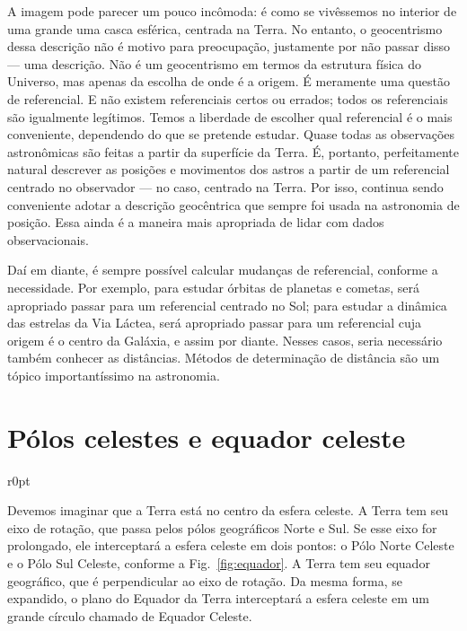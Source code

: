 A imagem pode parecer um pouco incômoda: é como se vivêssemos no interior de uma grande uma casca esférica, centrada na Terra. No entanto, o geocentrismo dessa descrição não é motivo para preocupação, justamente por não passar disso --- uma descrição. Não é um geocentrismo em termos da estrutura física do Universo, mas apenas da escolha de onde é a origem. É meramente uma questão de referencial. E não existem referenciais certos ou errados; todos os referenciais são igualmente legítimos. Temos a liberdade de escolher qual referencial é o mais conveniente, dependendo do que se pretende estudar. Quase todas as observações astronômicas são feitas a partir da superfície da Terra. É, portanto, perfeitamente natural descrever as posições e movimentos dos astros a partir de um referencial centrado no observador --- no caso, centrado na Terra. Por isso, continua sendo conveniente adotar a descrição geocêntrica que sempre foi usada na astronomia de posição. Essa ainda é a maneira mais apropriada de lidar com dados observacionais.

Daí em diante, é sempre possível calcular mudanças de referencial, conforme a necessidade. Por exemplo, para estudar órbitas de planetas e cometas, será apropriado passar para um referencial centrado no Sol; para estudar a dinâmica das estrelas da Via Láctea, será apropriado passar para um referencial cuja origem é o centro da Galáxia, e assim por diante. Nesses casos, seria necessário também conhecer as distâncias. Métodos de determinação de distância são um tópico importantíssimo na astronomia.

\section{Pólos celestes e equador celeste}

\begin{wrapfigure}{r}{0pt}

\caption{Esfera celeste mostrando o equador celeste e os pólos celestes.}
\label{fig:equador}
\end{wrapfigure}

Devemos imaginar que a Terra está no centro da esfera celeste. A Terra tem seu eixo de rotação, que passa pelos pólos geográficos Norte e Sul. Se esse eixo for prolongado, ele interceptará a esfera celeste em dois pontos: o Pólo Norte Celeste e o Pólo Sul Celeste, conforme a Fig.~\ref{fig:equador}. A Terra tem seu equador geográfico, que é perpendicular ao eixo de rotação. Da mesma forma, se expandido, o plano do Equador da Terra interceptará a esfera celeste em um grande círculo chamado de Equador Celeste.

